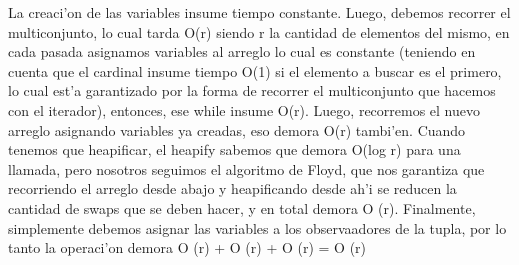 \documentclass[a4paper,10pt]{article}
\begin{document}
\begin{algoritmo}
   La creaci'on de las variables insume tiempo constante. Luego, debemos recorrer el multiconjunto, lo cual tarda O(r) siendo r la cantidad de elementos del mismo, en cada pasada asignamos variables al arreglo lo cual es constante (teniendo en cuenta que el cardinal insume tiempo O(1) si el elemento a buscar es el primero, lo cual est'a garantizado por la forma de recorrer el multiconjunto que hacemos con el iterador), entonces, ese while insume O(r). Luego, recorremos el nuevo arreglo asignando variables ya creadas, eso demora O(r) tambi'en. Cuando tenemos que heapificar, el heapify sabemos que demora O(log r) para una llamada, pero nosotros seguimos el algoritmo de Floyd, que nos garantiza que recorriendo el arreglo desde abajo y heapificando desde ah'i se reducen la cantidad de swaps que se deben hacer, y en total demora O (r). Finalmente, simplemente debemos asignar las variables a los observaadores de la tupla, por lo tanto la operaci'on demora O (r) + O (r) + O (r) = O (r)
   
\end{algoritmo}
\end{document}
